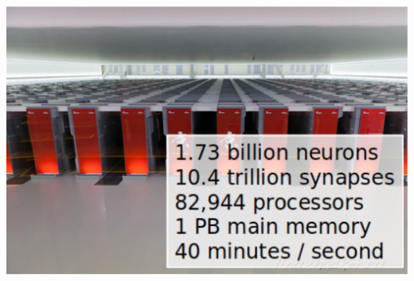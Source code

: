 \documentclass[8pt,t,usepdftitle=false]{beamer}
\begin{document}
\begin{frame}[t,plain]
\begin{columns}
\begin{column}{0.3\linewidth}
{        \includegraphics[width=\linewidth]{./figures/K.pdf}
      }
    \end{column}
  \end{columns}
\end{frame}
\end{document}
